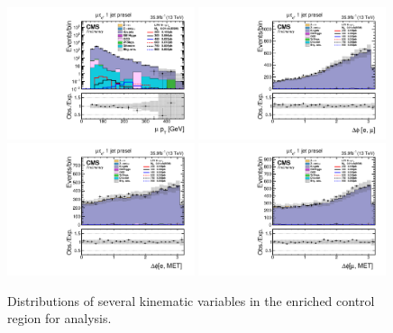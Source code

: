 {{\begin{figure}[htbp]
  \centering
  \captionsetup{width=.95\textwidth,justification=centering}
      \includegraphics[width=0.49\textwidth]{plots_and_figures/chapter6/tt_cr_hm/log_mutaue_1jet_presel_mPt.pdf}
      \includegraphics[width=0.49\textwidth]{plots_and_figures/chapter6/tt_cr_hm/mutaue_1jet_presel_dphiemu.pdf}\\
      \includegraphics[width=0.49\textwidth]{plots_and_figures/chapter6/tt_cr_hm/mutaue_1jet_presel_dphiEMet.pdf}
      \includegraphics[width=0.49\textwidth]{plots_and_figures/chapter6/tt_cr_hm/mutaue_1jet_presel_dphiMuMet.pdf}\\
     \caption{Distributions of several kinematic variables in the \ttb enriched control region for \Hmue analysis.}
     \label{fig:tt_cr}
\end{figure}

}}
